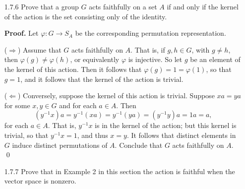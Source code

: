 \begin{enumerate}
      \textbf{Proof.} Let $K$ be the kernel of the action of $G$ on $A$ and let
      $K'$ be the kernel of the permutation representation
      $\varphi : G \rightarrow S_A$. The proof follows since
      \begin{align*}
         g \in K &\Longleftrightarrow ga = a &\quad\text{ for each } a \in A \\
            &\Longleftrightarrow (\varphi(g))(a)= a
               &\quad\text{ for each } a\in A \\
            &\Longleftrightarrow\varphi(g)\text{ is the identity permutation} \\
            &\Longleftrightarrow g \in K'.
      \end{align*} \qed
   \item[1.7.6]   Prove that a group $G$ acts faithfully on a set $A$ if and
                  only if the kernel of the action is the set consisting only of
                  the identity.

      \textbf{Proof.} Let $\varphi : G \rightarrow S_A$ be the corresponding 
      permutation representation.

      ($\Rightarrow$) Assume that $G$ acts faithfully on $A$. That is, if
      $g, h \in G$, with $g \neq h$, then $\varphi(g) \neq \varphi(h)$, or
      equivalently $\varphi$ is injective. So let $g$ be an element of the
      kernel of this action. Then it follows that
      $\varphi(g) = 1 = \varphi(1)$, so that $g = 1$, and it follows that the 
      kernel of the action is trivial.

      ($\Leftarrow$) Conversely, suppose the kernel of this action is trivial.
      Suppose $xa = ya$ for some $x, y \in G$ and for each $a \in A$. Then
      $$(y^{-1}x)a = y^{-1}(xa) = y^{-1}(ya) = (y^{-1}y)a = 1a = a,$$
      for each $a \in A$. That is, $y^{-1}x$ is in the kernel of the action;
      but this kernel is trivial, so that $y^{-1}x = 1$, and thus $x = y$. It
      follows that distinct elements in $G$ induce distinct permutations of $A$.
      Conclude that $G$ acts faithfully on $A$. \qed
   \item[1.7.7]   Prove that in Example 2 in this section the action is
                  faithful when the vector space is nonzero.


\end{enumerate}
